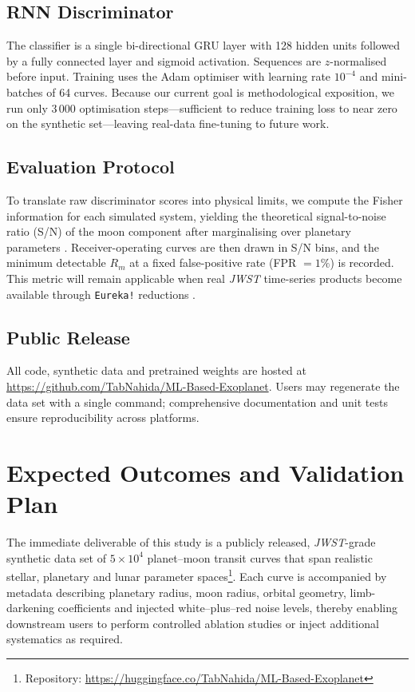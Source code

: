 \documentclass[11pt]{article}
\begin{document}
\subsection{RNN Discriminator}
The classifier is a single bi-directional GRU layer with 128 hidden units followed by a fully connected layer and sigmoid activation.  Sequences are $z$-normalised before input.  Training uses the Adam optimiser with learning rate $10^{-4}$ and mini-batches of 64 curves.  Because our current goal is methodological exposition, we run only 3\,000 optimisation steps—sufficient to reduce training loss to near zero on the synthetic set—leaving real-data fine-tuning to future work.

\subsection{Evaluation Protocol}
To translate raw discriminator scores into physical limits, we compute the Fisher information for each simulated system, yielding the theoretical signal-to-noise ratio (S/N) of the moon component after marginalising over planetary parameters \citep{PriceRogers2014}.  Receiver-operating curves are then drawn in S/N bins, and the minimum detectable $R_m$ at a fixed false-positive rate (FPR $=1\%$) is recorded.  This metric will remain applicable when real \textit{JWST} time-series products become available through \texttt{Eureka!} reductions \citep{Bell2022}.

\subsection{Public Release}
All code, synthetic data and pretrained weights are hosted at \url{https://github.com/TabNahida/ML-Based-Exoplanet}.  Users may regenerate the data set with a single command; comprehensive documentation and unit tests ensure reproducibility across platforms.

\section{Expected Outcomes and Validation Plan}
\label{sec:expected}
The immediate deliverable of this study is a publicly released, \textit{JWST}-grade synthetic data set of $5\times10^{4}$ planet–moon transit curves that span realistic stellar, planetary and lunar parameter spaces\footnote{Repository: \url{https://huggingface.co/TabNahida/ML-Based-Exoplanet}}.  Each curve is accompanied by metadata describing planetary radius, moon radius, orbital geometry, limb-darkening coefficients and injected white–plus–red noise levels, thereby enabling downstream users to perform controlled ablation studies or inject additional systematics as required.  
\end{document}

